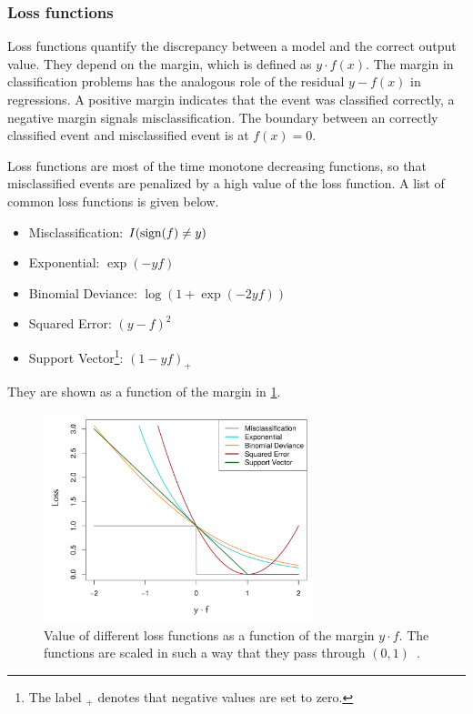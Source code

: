 \subsubsection{Loss functions}\label{subsub:bdt:boosting:lossfunction}

Loss functions quantify the discrepancy between a model and the correct output value.
They depend on the margin, which is defined as $y \cdot f(x)$.
The margin in classification problems has the analogous role of the residual $y - f(x)$ in regressions.
A positive margin indicates that the event was classified correctly, a negative margin signals misclassification.
The boundary between an correctly classified event and misclassified event is at $f(x) = 0$.

Loss functions are most of the time monotone decreasing functions, so that misclassified events are penalized by a high value
of the loss function.
A list of common loss functions is given below.
\begin{itemize}
    \item Misclassification: $I(\operatorname{sign}(f) \neq y)$
    \item Exponential: $\exp(-yf)$
    \item Binomial Deviance: $\log (1 + \exp(-2yf))$
    \item Squared Error: ${(y-f)}^2$
    \item Support Vector\footnote{The label ${}_+$ denotes that negative values are set to zero.}: ${(1-yf)}_+$
\end{itemize}
They are shown as a function of the margin in \cref{fig:bdt:loss_functions}.

\begin{figure}[htb]
    \centering
    \includegraphics[width=0.7\textwidth]{./figures/bdts/loss_functions.png}
    \caption{Value of different loss functions as a function of the margin $y \cdot f$.
             The functions are scaled in such a way that they pass through $(0, 1)$~\cite{Hastie2009}.}\label{fig:bdt:loss_functions}
\end{figure}

